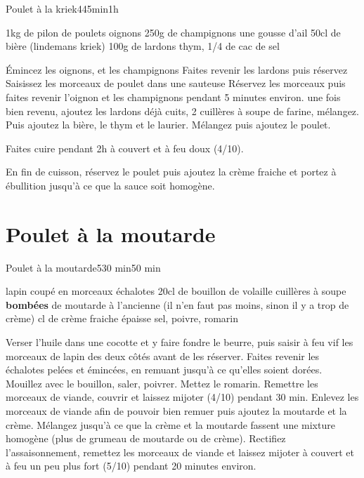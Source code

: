 {\begin{recette}{Poulet à la kriek}{4}{45min}{1h}
\begin{ingredients}
\ingredient 1kg de pilon de poulets
 oignons
\ingredient 250g de champignons
\ingredient une gousse d'ail
\ingredient 50cl de bière (lindemans kriek)
\ingredient 100g de lardons
\ingredient thym, 1/4 de cac de sel
\end{ingredients}

\begin{preparation}
\etape Émincez les oignons, et les champignons
\etape Faites revenir les lardons puis réservez
\etape Saisissez les morceaux de poulet dans une sauteuse
\etape Réservez les morceaux puis faites revenir l'oignon et les champignons pendant 5 minutes environ.
\etape une fois bien revenu, ajoutez les lardons déjà cuits, 2 cuillères à soupe de farine, mélangez. 
\etape Puis ajoutez la bière, le thym et le laurier. Mélangez puis ajoutez le poulet.
\end{preparation}

\begin{cuisson}
Faites cuire pendant 2h à couvert et à feu doux (4/10). 

En fin de cuisson, réservez le poulet puis ajoutez la crème fraiche et portez à ébullition jusqu'à ce que la sauce soit homogène.
\end{cuisson}
\end{recette}

\section{Poulet à la moutarde}
\begin{recette}{Poulet à la moutarde}{5}{30 min}{50 min}
\begin{ingredients}[6 pers.]
 lapin coupé en morceaux
 échalotes
\ingredient 20cl de bouillon de volaille
 cuillères à soupe \textbf{bombées} de moutarde à l'ancienne (il n'en faut pas moins, sinon il y a trop de crème)
 cl de crème fraiche épaisse
\ingredient sel, poivre, romarin
\end{ingredients}

\begin{preparation}
\etape Verser l'huile dans une cocotte et y faire fondre le beurre, puis saisir à feu vif les morceaux de lapin des deux côtés 
avant de les réserver.
\etape Faites revenir les échalotes pelées et émincées, en remuant jusqu'à ce qu'elles soient dorées.
\etape Mouillez avec le bouillon, saler, poivrer. Mettez le romarin. Remettre les morceaux de viande, couvrir et laissez mijoter (4/10) pendant 30 min.
\etape Enlevez les morceaux de viande afin de pouvoir bien remuer puis ajoutez la moutarde et la crème. Mélangez 
jusqu'à ce que la crème et la moutarde fassent une mixture homogène (plus de grumeau de moutarde ou de crème). 
\etape Rectifiez l'assaisonnement, remettez les morceaux de viande et laissez mijoter à couvert et à feu un peu plus fort (5/10) pendant 20 minutes environ.
\end{preparation}
\end{recette}

}
